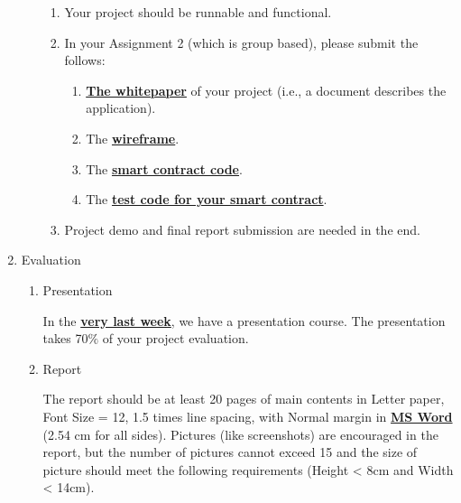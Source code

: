 \documentclass[12pt]{article}
\renewcommand{\_}{\kern-1.5pt\textunderscore\kern-1.5pt}
\begin{document}
\begin{enumerate}
\begin{enumerate}
\begin{enumerate}
	\item Your project should be runnable and functional.\par

	\item In your Assignment 2 (which is group based), please submit the follows:\par

\begin{enumerate}
	\item \textbf{\uline{The whitepaper}} of your project (i.e., a document describes the application). \par

	\item The \textbf{\uline{wireframe}}.\par

	\item The \textbf{\uline{smart contract code}}.\par

	\item The \textbf{\uline{test code for your smart contract}}.\par


\end{enumerate}
	\item Project demo and final report submission are needed in the end.\par


\end{enumerate}
\end{enumerate}
	\item Evaluation\par

\begin{enumerate}
	\item Presentation\par

In the \textbf{\uline{very last week}}, we have a presentation course. The presentation takes 70$\%$  of your project evaluation. \par

	\item Report\par

The report should be at least 20 pages of main contents in Letter paper, Font Size = 12, 1.5 times line spacing, with Normal margin in \textbf{\uline{MS Word}} (2.54 cm for all sides). Pictures (like screenshots) are encouraged in the report, but the number of pictures cannot exceed 15 and the size of picture should meet the following requirements (Height < 8cm and Width < 14cm).\par


\end{enumerate}
\end{enumerate}
\end{document}
